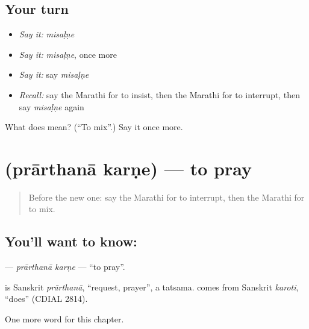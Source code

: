 \subsection*{Your turn}
\begin{itemize}
\raggedright
  \item \emph{Say it:} \emph{misaḷṇe}
  \item \emph{Say it:} \emph{misaḷṇe}, once more
  \item \emph{Say it:} say \emph{misaḷṇe}
  \item \emph{Recall:} say the Marathi for to insist, then the Marathi for to interrupt, then say \emph{misaḷṇe} again
\end{itemize}

\begin{tcolorbox}[breakable,colback=teal!4,colframe=teal!35!black,title={Before you move on}]
What does  mean? (\textquotedblleft{}To mix\textquotedblright{}.) Say it once more.
\end{tcolorbox}
\section[\texorpdfstring{\mr{प्रार्थना} \mr{करणे} (prārthanā karṇe)}{प्रार्थना करणे (prārthanā karṇe)}]{  (prārthanā karṇe) — to pray}

\label{lesson:MR-C255-prarthana-karne}



\begin{quote}
Before the new one: say the Marathi for to interrupt, then the Marathi for to mix.
\end{quote}

\subsection*{You'll want to know:  }
\textbf{ } — \emph{prārthanā karṇe} — \textquotedblleft{}to pray\textquotedblright{}.

\begin{cousinweb}
\textbf{} is Sanskrit \emph{prārthanā}, \textquotedblleft{}request, prayer\textquotedblright{}, a tatsama. \textbf{} comes from Sanskrit \emph{karoti}, \textquotedblleft{}does\textquotedblright{} (CDIAL 2814).
\end{cousinweb}

\begin{grammarlens}[title={What you've built}]
One more word for this chapter.
\end{grammarlens}


